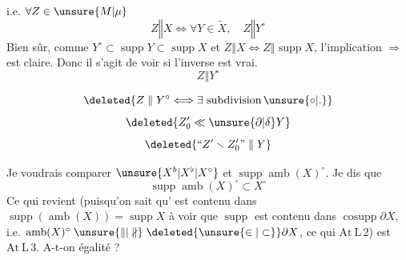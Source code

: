i.e. $\forall Z\in\unsure{M|\mu}$
\[
Z\mathrel{\Vert}X\Longleftrightarrow\forall Y\in\widetilde X,\quad Z\mathrel{\Vert}Y^{\circ}
\]
Bien sûr, comme $Y^{\circ}\subset\operatorname{supp}Y\subset\operatorname{supp}X$ et $Z\mathrel{\Vert}X\Leftrightarrow Z\mathrel{\Vert}\operatorname{supp}X$, l'implication $\Longrightarrow$ est claire. Donc il s'agit de voir si l'inverse est vrai. 
\[
Z\mathrel{\Vert}Y^{\circ}
\]

\[
\deleted{Z\mathrel{\Vert}Y^{\circ}\Longleftrightarrow\exists\text{ subdivision}\,\unsure{\circ|.}}
\]
\[
\deleted{Z'_0\ll\unsure{\partial|\delta}Y}
\]
\[
\deleted{\text{``}Z'\smallsetminus Z'_0\text{''}\mathrel{\Vert}Y}
\]

Je voudrais comparer $\unsure{X^{b}|X^{\flat}|X^{\circ}}$ et $\operatorname{supp}\operatorname{amb}(X)^{\circ}$. Je dis que
\[
\operatorname{supp}\operatorname{amb}(X)^{\circ}\subset X^{\circ}\tag*{(\alpha).}
\]
Ce qui revient (puisqu'on sait  qu'  est contenu dans $\operatorname{supp}(\operatorname{amb}(X))=\operatorname{supp}X$\unsure{,|)} à voir que $\operatorname{supp}$ est contenu dans $\operatorname{cosupp}\partial X$, i.e.  $\operatorname{amb}(X)^{\circ}\mathrel{\unsure{\Vert|\nparallel}}\deleted{\unsure{\in|\subset}}\partial X$, ce qui     $\mathrm{At\ L\,2}$) est $\mathrm{At\ L\,3}$.  A-t-on égalité ?
